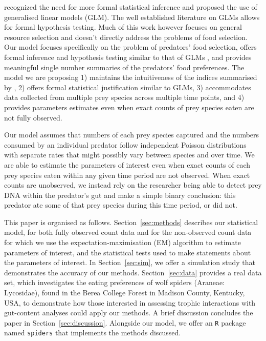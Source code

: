 \documentclass[smallextended]{svjour3}
\begin{document}
\citet{Manly:2002} recognized the need for more formal statistical inference and proposed the use of generalised linear models (GLM).  The well established literature on GLMs allows for formal hypothesis testing.  Much of this work however focuses on general resource selection and doesn't directly address the problems of food selection.  Our model focuses specifically on the problem of predators' food selection, offers formal inference and hypothesis testing similar to that of GLMs \citet{Manly:2002}, and provides meaningful single number summaries of the predators' food preferences.  The model we are proposing 1) maintains the intuitiveness of the indices summarised by \citet{Lechowicz:1982, Manly:2002}, 2) offers formal statistical justification similar to GLMs, 3) accommodates data collected from multiple prey species across multiple time points, and 4) provides parameters estimates even when exact counts of prey species eaten are not fully observed.


Our model assumes that numbers of each prey species captured and the numbers consumed by an individual predator follow independent Poisson distributions with separate rates that might possibly vary between species and over time.  We are able to estimate the parameters of interest even when exact counts of each prey species eaten within any given time period are not observed.  When exact counts are unobserved, we instead rely on the researcher being able to detect prey DNA within the predator's gut \citep{Schmidt:2014,Raso:2014,Madduppa:2014} and make a simple binary conclusion: this predator ate some of that prey species during this time period, or did not.  

This paper is organised as follows.  Section~\ref{sec:methods} describes our statistical model, for both fully observed count data and for the non-observed count data for which we use the expectation-maximisation (EM) algorithm to estimate parameters of interest, and the statistical tests used to make statements about the parameters of interest.  In Section~\ref{sec:sim}, we offer a simulation study that demonstrates the accuracy of our methods.  Section~\ref{sec:data} provides a real data set, which investigates the eating preferences of wolf spiders (Araneae: Lycosidae), found in the Berea College Forest in Madison County, Kentucky, USA, to demonstrate how those interested in assessing trophic interactions with gut-content analyses could apply our methods.  A brief discussion concludes the paper in Section~\ref{sec:discussion}.  Alongside our model, we offer an \texttt{R} \citep{Core-Team:2014} package named \texttt{spiders} that implements the methods discussed.  
\end{document}
